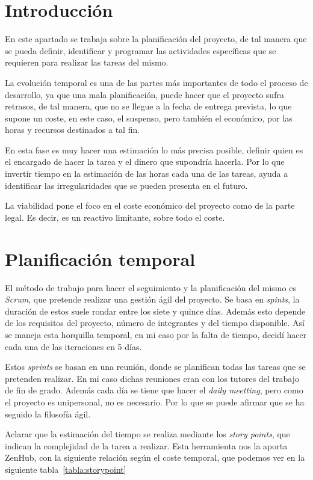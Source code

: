 
\section{Introducción}
En este apartado se trabaja sobre la planificación del proyecto, de tal manera que se pueda definir, identificar y programar las actividades específicas que se requieren para realizar las tareas del mismo. 

La evolución temporal es una de las partes más importantes de todo el proceso de desarrollo, ya que una mala planificación, puede hacer que el proyecto sufra retrasos, de tal manera, que no se llegue a la fecha de entrega prevista, lo que supone un coste, en este caso, el suspenso, pero también el económico, por las horas y recursos destinados a tal fin.

En esta fase es muy hacer una estimación lo más precisa posible, definir quien es el encargado de hacer la tarea y el dinero que supondría hacerla. Por lo que invertir tiempo en la estimación de las horas cada una de las tareas, ayuda a identificar las irregularidades que se pueden presenta en el futuro.

La viabilidad pone el foco en el coste económico del proyecto como de la parte legal. Es decir, es un reactivo limitante, sobre todo el coste.

\section{Planificación temporal}
El método de trabajo para hacer el seguimiento y la planificación del mismo es \emph{Scrum}, que pretende realizar una gestión ágil del proyecto. Se basa en \emph{spints}, la duración de estos suele rondar entre los siete y quince días. Además esto depende de los requisitos del proyecto, número de integrantes y del tiempo disponible. Así se maneja esta horquilla temporal, en mi caso por la falta de tiempo, decidí hacer cada una de las iteraciones en 5 días. 

Estos \emph{sprints} se basan en una reunión, donde se planifican todas las tareas que se pretenden realizar. En mi caso dichas reuniones eran con los tutores del trabajo de fin de grado. Además cada día se tiene que hacer el \emph{daily meetting}, pero como el proyecto es unipersonal, no es necesario. Por lo que se puede afirmar que se ha seguido la filosofía ágil.

Aclarar que la estimación del tiempo se realiza mediante los \emph{story points}, que indican la complejidad de la tarea a realizar. Esta herramienta nos la aporta ZenHub, con la siguiente relación según el coste temporal, que podemos ver en la siguiente tabla~\ref{tabla:storypoint}

